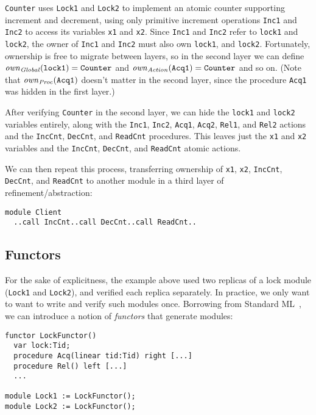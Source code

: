 \verb`Counter` uses \verb`Lock1` and \verb`Lock2` to implement an atomic counter supporting increment and decrement,
using only primitive increment operations \verb`Inc1` and \verb`Inc2` to access its variables \verb`x1` and \verb`x2`.
Since \verb`Inc1` and \verb`Inc2` refer to \verb`lock1` and \verb`lock2`,
the owner of \verb`Inc1` and \verb`Inc2` must also own \verb`lock1`, and \verb`lock2`.
Fortunately, ownership is free to migrate between layers,
so in the second layer we can define
$\mathit{own}_{\mathit{Global}}(\mathtt{lock1}) = \mathtt{Counter}$ and $\mathit{own}_{\mathit{Action}}(\mathtt{Acq1}) = \mathtt{Counter}$ and so on.
(Note that $\mathit{own}_{\mathit{Proc}}(\mathtt{Acq1})$ doesn't matter in the second layer,
since the procedure \verb`Acq1` was hidden in the first layer.)

After verifying \verb`Counter` in the second layer,
we can hide the \verb`lock1` and \verb`lock2` variables entirely,
along with the \verb`Inc1`, \verb`Inc2`, \verb`Acq1`, \verb`Acq2`, \verb`Rel1`, and \verb`Rel2` actions
and the \verb`IncCnt`, \verb`DecCnt`, and \verb`ReadCnt` procedures.
This leaves just the \verb`x1` and \verb`x2` variables
and the \verb`IncCnt`, \verb`DecCnt`, and \verb`ReadCnt` atomic actions.

We can then repeat this process, transferring ownership of
\verb`x1`, \verb`x2`, \verb`IncCnt`, \verb`DecCnt`, and \verb`ReadCnt`
to another module in a third layer of refinement/abstraction:

\begin{verbatim}
module Client
  ..call IncCnt..call DecCnt..call ReadCnt..
\end{verbatim}

\subsection{Functors}

For the sake of explicitness, the example above used two replicas of a lock module
(\verb`Lock1` and \verb`Lock2`),
and verified each replica separately.
In practice, we only want to want to write and verify such modules once.
Borrowing from Standard ML~\cite{StandardML},
we can introduce a notion of {\it functors} that generate modules:

\begin{verbatim}
functor LockFunctor()
  var lock:Tid;
  procedure Acq(linear tid:Tid) right [...]
  procedure Rel() left [...]
  ...

module Lock1 := LockFunctor();
module Lock2 := LockFunctor();
\end{verbatim}

